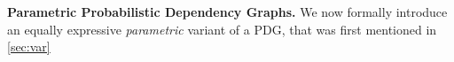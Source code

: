 \textbf{Parametric Probabilistic Dependency Graphs.}
We now formally introduce an equally expressive \emph{parametric} variant of a PDG,
    that was first mentioned in \cref{sec:var}

